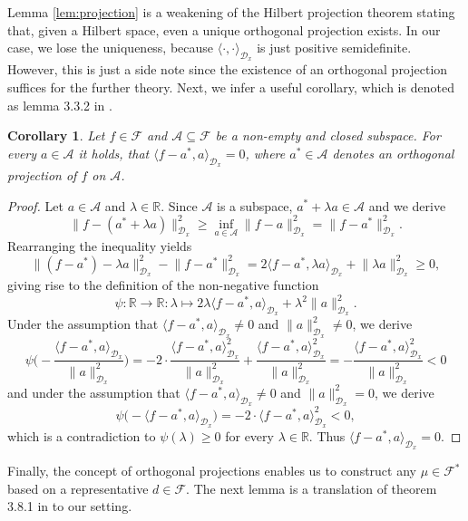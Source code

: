 \documentclass[11pt, a4paper]{article}
\newtheorem{corollary}[theorem]{Corollary}
\newcommand{\R}{\mathbb{R}}
\newcommand{\A}{\mathcal{A}}
\newcommand{\D}{\mathcal{D}}
\newcommand{\F}{\mathcal{F}}
\begin{document}
Lemma \ref{lem:projection} is a weakening of the Hilbert projection theorem stating that, given a Hilbert space, even a unique orthogonal projection exists. In our case, we lose the uniqueness, because $\langle \cdot, \cdot \rangle_{\D_x}$ is just positive semidefinite. However, this is just a side note since the existence of an orthogonal projection suffices for the further theory. Next, we infer a useful corollary, which is denoted as lemma 3.3.2 in \cite{FunctionalAnalysis}.

\begin{corollary} \label{cor:projection}
Let $f \in \F$ and $\A \subseteq \F$ be a non-empty and closed subspace. For every $a \in \A$ it holds, that $\langle f - a^* , a \rangle_{\D_x} = 0$, where $a^* \in \A$ denotes an orthogonal projection of $f$ on $\A$.
\end{corollary}

\begin{proof}
Let $a \in \A$ and $\lambda \in \R$. Since $\A$ is a subspace, $a^* + \lambda a \in \A$ and we derive
\[ \big \| f - (a^* + \lambda a) \big \|_{\D_x}^2 \geq  \inf_{a \in \A} \big \| f - a \big \|_{\D_x}^2 = \big \| f - a^* \big \|_{\D_x}^2. \]
Rearranging the inequality yields
\[ \big \| (f - a^*) - \lambda a \big \|_{\D_x} ^2 - \big \| f - a^* \big \|_{\D_x}^2 = 2 \big \langle f - a^* , \lambda a \big \rangle_{\D_x} + \big \| \lambda a \big \|_{\D_x}^2 \geq 0, \]
giving rise to the definition of the non-negative function
\[ \psi : \R \to \R : \lambda \mapsto 2 \lambda \big \langle f - a^*, a \big \rangle_{\D_x} + \lambda^2 \big \| a \big \|_{\D_x}^2. \]
Under the assumption that $\big \langle f - a^* , a \big \rangle_{\D_x} \neq 0$ and $\| a \|_{\D_x}^2 \neq 0$, we derive
\[ \psi \Big ( - \frac{ \big \langle f - a^*, a \big \rangle_{\D_x}}{\| a \|_{\D_x}^2} \Big ) = -2 \cdot \frac{ \big \langle f - a^*, a \big \rangle_{\D_x}^2}{ \| a \|_{\D_x}^2} + \frac{\big \langle f - a^*, a \big \rangle_{\D_x}^2}{ \| a \|_{\D_x}^2} = - \frac{ \big \langle f - a^*, a \big \rangle_{\D_x}^2}{ \| a \|_{\D_x}^2} < 0 \]
and under the assumption that $\big \langle f - a^*, a \big \rangle_{\D_x} \neq 0$ and $\| a \|_{\D_x}^2 = 0$, we derive
\[ \psi \Big ( -  \big \langle f - a^*, a \big \rangle_{\D_x} \Big ) = -2 \cdot \big \langle f - a^*, a \big \rangle_{\D_x}^2 < 0, \]
which is a contradiction to $\psi(\lambda) \geq 0$ for every $\lambda \in \R$. Thus $ \big \langle f - a^* , a \big \rangle_{\D_x} = 0$.
\end{proof}

Finally, the concept of orthogonal projections enables us to construct any $\mu \in \F^*$ based on a representative $d \in \F$. The next lemma is a translation of theorem 3.8.1 in \cite{FunctionalAnalysis} to our setting.
\end{document}
